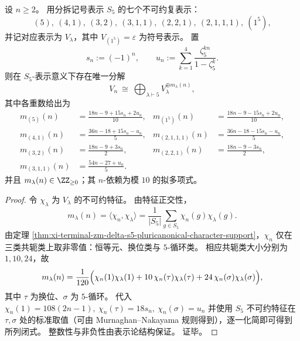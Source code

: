 \begin{theorem}\label{thm:xi-terminal-zm-delta-s5-pluricanonical-irrep-decomposition-period10}
设 \(n\ge 2\)。
用分拆记号表示 \(S_5\) 的七个不可约复表示：
\[
(5),\ (4,1),\ (3,2),\ (3,1,1),\ (2,2,1),\ (2,1,1,1),\ (1^5),
\]
并记对应表示为 \(V_\lambda\)，其中 \(V_{(1^5)}=\varepsilon\) 为符号表示。
置
\[
s_n:=(-1)^n,\qquad
u_n:=\sum_{k=1}^4\frac{\zeta_5^{kn}}{1-\zeta_5^{k}}.
\]
则在 \(S_5\)-表示意义下存在唯一分解
\[
V_n\ \cong\ \bigoplus_{\lambda\vdash 5} V_\lambda^{\oplus m_\lambda(n)},
\]
其中各重数给出为
\[
\begin{aligned}
m_{(5)}(n)&=\frac{18n-9+15s_n+2u_n}{10},&
m_{(1^5)}(n)&=\frac{18n-9-15s_n+2u_n}{10},\\[2mm]
m_{(4,1)}(n)&=\frac{36n-18+15s_n-u_n}{5},&
m_{(2,1,1,1)}(n)&=\frac{36n-18-15s_n-u_n}{5},\\[2mm]
m_{(3,2)}(n)&=\frac{18n-9+3s_n}{2},&
m_{(2,2,1)}(n)&=\frac{18n-9-3s_n}{2},\\[2mm]
m_{(3,1,1)}(n)&=\frac{54n-27+u_n}{5}.&
&
\end{aligned}
\]
并且 \(m_\lambda(n)\in\ZZ_{\ge 0}\)；其 \(n\)-依赖为模 \(10\) 的拟多项式。
\end{theorem}
\begin{proof}
令 \(\chi_\lambda\) 为 \(V_\lambda\) 的不可约特征。
由特征正交性，
\[
m_\lambda(n)=\langle \chi_n,\chi_\lambda\rangle
=\frac{1}{|S_5|}\sum_{g\in S_5}\chi_n(g)\chi_\lambda(g).
\]
由定理 \ref{thm:xi-terminal-zm-delta-s5-pluricanonical-character-support}，\(\chi_n\) 仅在三类共轭类上取非零值：恒等元、换位类与 \(5\)-循环类。
相应共轭类大小分别为 \(1,10,24\)，故
\[
m_\lambda(n)
=\frac{1}{120}\Bigl(\chi_n(1)\chi_\lambda(1)+10\,\chi_n(\tau)\chi_\lambda(\tau)+24\,\chi_n(\sigma)\chi_\lambda(\sigma)\Bigr),
\]
其中 \(\tau\) 为换位、\(\sigma\) 为 \(5\)-循环。
代入
\(
\chi_n(1)=108(2n-1),\ \chi_n(\tau)=18s_n,\ \chi_n(\sigma)=u_n
\)
并使用 \(S_5\) 不可约特征在 \(\tau,\sigma\) 处的标准取值（可由 Murnaghan--Nakayama 规则得到），逐一化简即可得到所列闭式。
整数性与非负性由表示论结构保证。
证毕。
\end{proof}

